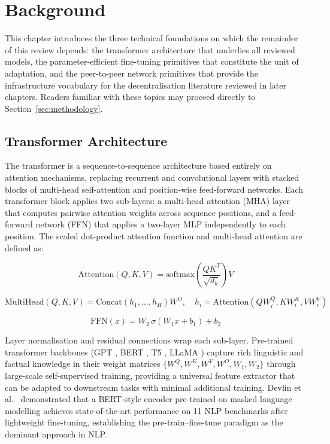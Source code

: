 \section{Background}
\label{sec:background}

This chapter introduces the three technical foundations on which the
remainder of this review depends: the transformer architecture that underlies
all reviewed models, the parameter-efficient fine-tuning primitives that
constitute the unit of adaptation, and the peer-to-peer network primitives
that provide the infrastructure vocabulary for the decentralisation
literature reviewed in later chapters. Readers familiar with these topics
may proceed directly to Section~\ref{sec:methodology}.

\subsection{Transformer Architecture}
\label{sec:background:transformer}

The transformer \cite{Vaswani2017} is a sequence-to-sequence architecture based
entirely on attention mechanisms, replacing recurrent and convolutional layers with
stacked blocks of multi-head self-attention and position-wise feed-forward networks.
Each transformer block applies two sub-layers: a multi-head attention (MHA) layer
that computes pairwise attention weights across sequence positions, and a feed-forward
network (FFN) that applies a two-layer MLP independently to each position. The
scaled dot-product attention function and multi-head attention are defined as:

\begin{equation}
\mathrm{Attention}(Q,K,V) = \mathrm{softmax}\!\left(\frac{Q K^T}{\sqrt{d_k}}\right) V
\label{eq:attention}
\end{equation}

\begin{equation}
\mathrm{MultiHead}(Q,K,V) = \mathrm{Concat}(h_1,\ldots,h_H) W^O,
\quad h_i = \mathrm{Attention}(Q W^Q_i, K W^K_i, V W^V_i)
\label{eq:mha}
\end{equation}

\begin{equation}
\text{FFN}(x) = W_2 \, \sigma(W_1 x + b_1) + b_2
\label{eq:ffn}
\end{equation}

Layer normalisation and residual connections wrap each sub-layer. Pre-trained
transformer backbones (GPT \cite{RadfordGPT22019,BrownGPT32020}, BERT \cite{Devlin2019}, T5 \cite{RaffelT52020}, LLaMA \cite{TouvronLLaMA2023}) capture rich linguistic and factual
knowledge in their weight matrices $\{W^Q, W^K, W^V, W^O, W_1, W_2\}$ through
large-scale self-supervised training, providing a universal feature extractor that
can be adapted to downstream tasks with minimal additional training. Devlin et al.~\cite{Devlin2019}
demonstrated that a BERT-style encoder pre-trained on masked language modelling
achieves state-of-the-art performance on 11 NLP benchmarks after lightweight
fine-tuning, establishing the pre-train--fine-tune paradigm as the dominant approach
in NLP.

